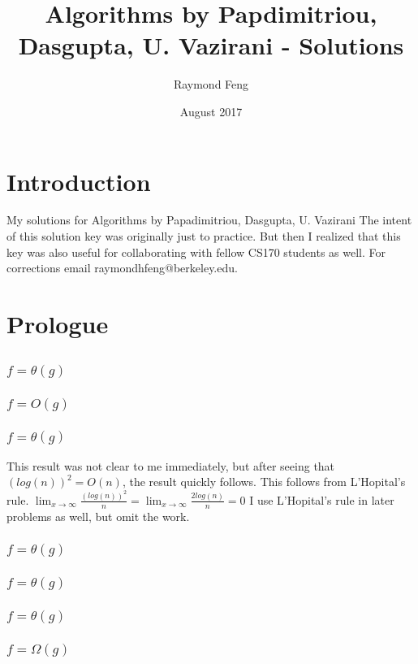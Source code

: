 \documentclass{article}
\title{Algorithms by Papdimitriou, Dasgupta, U. Vazirani - Solutions}
\author{Raymond Feng}
\date{August 2017}
\begin{document}
\maketitle

\setcounter{section}{-2}
\section{Introduction}
My solutions for Algorithms by Papadimitriou, Dasgupta, U. Vazirani
The intent of this solution key was originally just to practice. But then I realized that this key was also useful for collaborating with fellow CS170 students as well. For corrections email raymondhfeng@berkeley.edu.

\setcounter{section}{-1}
\section{Prologue}
\subsection{}
\subsubsection{$f = \theta(g)$}
\subsubsection{$f = O(g)$}
\subsubsection{$f = \theta(g)$}
This result was not clear to me immediately, but after seeing that $(log(n))^2 = O(n)$, the result quickly follows. This follows from L'Hopital's rule.  $\lim_{x\to\infty}\frac{(log(n))^2}{n}=\lim_{x\to\infty}\frac{2log(n)}{n}=0$
I use L'Hopital's rule in later problems as well, but omit the work. 
\subsubsection{$f = \theta(g)$}
\subsubsection{$f = \theta(g)$}
\subsubsection{$f = \theta(g)$}
\subsubsection{$f = \Omega(g)$}
\end{document}
